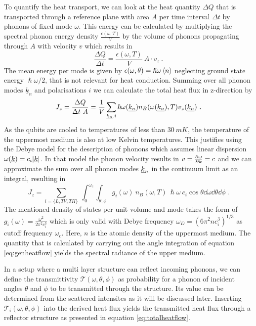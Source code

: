 To quantify the heat transport, we can look at the heat quantity $\Delta Q$
that is transported through a reference plane with area $A$ per time interval
$\Delta t$ by phonons of fixed mode $\omega$. This energy can be calculated by
multiplying the spectral phonon energy density $\frac{\epsilon(\omega,T)}{V}$
by the volume of phonons propagating through $A$ with velocity $v$ which
results in
\begin{equation}
    \frac{\Delta Q}{\Delta t} = \frac{\epsilon(\omega, T)}{V}\ A\cdot v_z\ .
\end{equation}
The mean energy per mode is given by $\epsilon(\omega, \theta) = \hslash
    \omega \expval{n}$ neglecting ground state energy $\hslash \omega / 2$,
that is not relevant for heat conduction. Summing over all phonon modes
$\underline{k}_n$ and polarisations $i$ we can calculate the total heat flux
in z-direction by
\begin{equation}
    J_z = \frac{\Delta Q}{\Delta t\ A} = \frac{1}{V} \sum\limits_{
        \underline{k_n}, i}\hslash \omega(\underline{k_n})
    n_B(\omega(\underline{k_n}),T) v_z(\underline{k_n}) \ .
\end{equation}
As the qubits are cooled to temperatures of less than $\SI{30}{mK}$, the
temperature of the uppermost medium is also at low Kelvin temperatures. This
justifies using the Debye model for the description of phonons which assumes
linear dispersion $\omega(\underline{k})=c_i |\underline{k}|$.
In that model the phonon velocity results in $v = \frac{\partial \omega}{\partial k}=c$ and we
can
approximate the
sum over all phonon modes $\underline{k}_n$ in the continuum limit as an integral,
resulting in
\begin{equation}\label{eq:genheatflow}
    J_z = \sum\limits_{i=\{L,TV,TH\}}\ \int_0^{\omega_c}\int_{\theta, \phi}
    g_i(\omega)\ n_B(\omega, T)\
    \hslash \omega\  c_i\cos \theta \dd{\omega} \dd{\theta}\dd{\phi} \ .
\end{equation}
The mentioned density of states per unit volume and mode takes the form of
$g_i(\omega)= \frac{\omega^2}{2\pi^2 c_i^3}$ \cite{Simon2016} which is only
valid with Debye frequency $\omega_D = (6\pi^2 n c_i^3)^{1/3}$ as cutoff
frequency $\omega_c$. Here, $n$ is the atomic density of the uppermost medium.
The quantity that is calculated by carrying out the angle integration of equation
\ref{eq:genheatflow} yields the spectral radiance of the upper medium.

In a setup where a multi layer structure can reflect incoming phonons,
we can define the transmittivity $\mathcal{T}(\omega,\theta, \phi)$ as
probability for a phonon of incident angles $\theta$ and $\phi$ to be
transmitted through the structure. Its value can be determined from
the scattered intensites as it will be discussed later. Inserting
$\mathcal{T}_i(\omega, \theta, \phi)$ into the derived heat flux yields
the transmitted heat flux through a reflector structure as presented in
equation \ref{eq:totalheatflow}.

